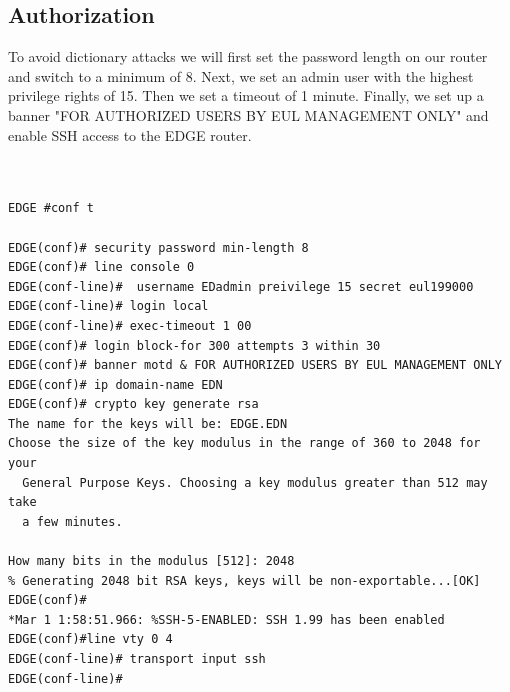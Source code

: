 \documentclass[ a4, 12pt, onecolumn]{IEEEtran}
\begin{document}
 \subsection{Authorization}
To avoid dictionary attacks we will first set the password length on our router and switch to a minimum of 8. Next, we set an admin user with the highest privilege rights of 15. Then we set a timeout of 1 minute. Finally, we set up a banner "FOR AUTHORIZED USERS BY EUL MANAGEMENT ONLY" and enable SSH access to the EDGE router.
\begin{center}
\begin{lstlisting}


EDGE #conf t

EDGE(conf)# security password min-length 8
EDGE(conf)# line console 0
EDGE(conf-line)#  username EDadmin preivilege 15 secret eul199000 
EDGE(conf-line)# login local
EDGE(conf-line)# exec-timeout 1 00
EDGE(conf)# login block-for 300 attempts 3 within 30
EDGE(conf)# banner motd & FOR AUTHORIZED USERS BY EUL MANAGEMENT ONLY
EDGE(conf)# ip domain-name EDN
EDGE(conf)# crypto key generate rsa
The name for the keys will be: EDGE.EDN
Choose the size of the key modulus in the range of 360 to 2048 for your
  General Purpose Keys. Choosing a key modulus greater than 512 may take
  a few minutes.

How many bits in the modulus [512]: 2048
% Generating 2048 bit RSA keys, keys will be non-exportable...[OK]
EDGE(conf)#
*Mar 1 1:58:51.966: %SSH-5-ENABLED: SSH 1.99 has been enabled
EDGE(conf)#line vty 0 4
EDGE(conf-line)# transport input ssh
EDGE(conf-line)#

\end{lstlisting}
\end{center} 
\end{document}

